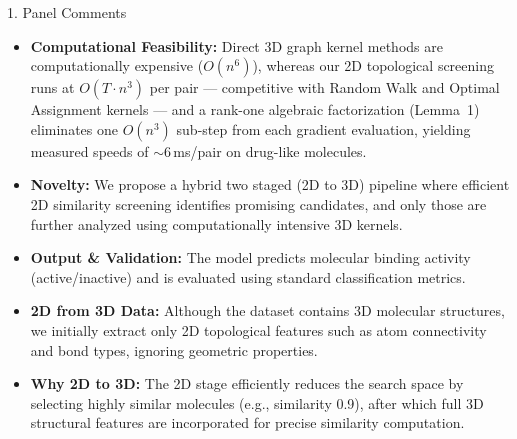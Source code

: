 \documentclass[aspectratio=169, 11pt]{beamer}
\begin{document}
\begin{frame}{1. Panel Comments}
\small
\begin{itemize}

\item \textbf{Computational Feasibility:} Direct 3D graph kernel methods are computationally expensive ($O(n^6)$), whereas our 2D topological screening runs at $O(T \cdot n^3)$ per pair --- competitive with Random Walk and Optimal Assignment kernels --- and a rank-one algebraic factorization (Lemma~1) eliminates one $O(n^3)$ sub-step from each gradient evaluation, yielding measured speeds of ${\sim}6$\,ms/pair on drug-like molecules.

\item \textbf{Novelty:} We propose a hybrid two staged (2D to 3D) pipeline where efficient 2D similarity screening identifies promising candidates, and only those are further analyzed using computationally intensive 3D kernels.

\item \textbf{Output \& Validation:} The model predicts molecular binding activity (active/inactive) and is evaluated using standard classification metrics.

\item \textbf{2D from 3D Data:} Although the dataset contains 3D molecular structures, we initially extract only 2D topological features such as atom connectivity and bond types, ignoring geometric properties.

\item \textbf{Why 2D to 3D:} The 2D stage efficiently reduces the search space by selecting highly similar molecules (e.g., similarity 0.9), after which full 3D structural features are incorporated for precise similarity computation.

\end{itemize}
\end{frame}

\end{document}
